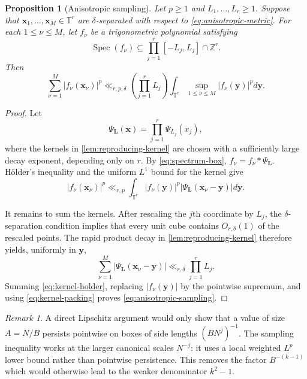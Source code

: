 \documentclass[11pt,reqno]{amsart}
\numberwithin{equation}{section}
\newtheorem{proposition}[proposition]{Proposition}
\theoremstyle{definition}
\theoremstyle{remark}
\newtheorem{remark}[remark]{Remark}
\newcommand{\Z}{\mathbb Z}
\newcommand{\T}{\mathbb T}
\newcommand{\Spec}{\operatorname{Spec}}
\begin{document}
\begin{proposition}[Anisotropic sampling]\label{prop:anisotropic-sampling}
Let $p\ge1$ and $L_1,\ldots,L_r\ge1$.  Suppose that
$\boldsymbol x_1,\ldots,\boldsymbol x_M\in\T^r$ are $\delta$-separated with respect to \eqref{eq:anisotropic-metric}.  For each $1\le\nu\le M$, let $f_\nu$ be a trigonometric polynomial satisfying
\begin{equation}\label{eq:spectrum-box}
  \Spec(f_\nu)
  \subseteq
  \prod_{j=1}^{r}[-L_j,L_j]\cap\Z^r.
\end{equation}
Then
\begin{equation}\label{eq:anisotropic-sampling}
  \sum_{\nu=1}^{M}|f_\nu(\boldsymbol x_\nu)|^p
  \ll_{r,p,\delta}
  \left(\prod_{j=1}^{r}L_j\right)
  \int_{\T^r}
  \sup_{1\le\nu\le M}|f_\nu(\boldsymbol y)|^p
  d\boldsymbol y.
\end{equation}
\end{proposition}

\begin{proof}
Let
\[
  \Psi_{\boldsymbol L}(\boldsymbol x)
  =\prod_{j=1}^{r}\Psi_{L_j}(x_j),
\]
where the kernels in \cref{lem:reproducing-kernel} are chosen with a sufficiently large decay exponent, depending only on $r$.  By \eqref{eq:spectrum-box},
$f_\nu=f_\nu*\Psi_{\boldsymbol L}$.  H\"older's inequality and the uniform $L^1$ bound for the kernel give
\begin{equation}\label{eq:kernel-holder}
  |f_\nu(\boldsymbol x_\nu)|^p
  \ll_{r,p}
  \int_{\T^r}
  |f_\nu(\boldsymbol y)|^p
  |\Psi_{\boldsymbol L}(\boldsymbol x_\nu-\boldsymbol y)|
  d\boldsymbol y.
\end{equation}

It remains to sum the kernels.  After rescaling the $j$th coordinate by $L_j$, the $\delta$-separation condition implies that every unit cube contains $O_{r,\delta}(1)$ of the rescaled points.  The rapid product decay in \cref{lem:reproducing-kernel} therefore yields, uniformly in $\boldsymbol y$,
\begin{equation}\label{eq:kernel-packing}
  \sum_{\nu=1}^{M}
  |\Psi_{\boldsymbol L}(\boldsymbol x_\nu-\boldsymbol y)|
  \ll_{r,\delta}
  \prod_{j=1}^{r}L_j.
\end{equation}
Summing \eqref{eq:kernel-holder}, replacing $|f_\nu(\boldsymbol y)|$ by the pointwise supremum, and using \eqref{eq:kernel-packing} proves \eqref{eq:anisotropic-sampling}.
\end{proof}

\begin{remark}\label{rem:sampling-vs-stability}
A direct Lipschitz argument would only show that a value of size $A=N/B$ persists pointwise on boxes of side lengths $(BN^j)^{-1}$.  The sampling inequality works at the larger canonical scales $N^{-j}$: it uses a local weighted $L^p$ lower bound rather than pointwise persistence.  This removes the factor $B^{-(k-1)}$ which would otherwise lead to the weaker denominator $k^2-1$.
\end{remark}
\end{document}
